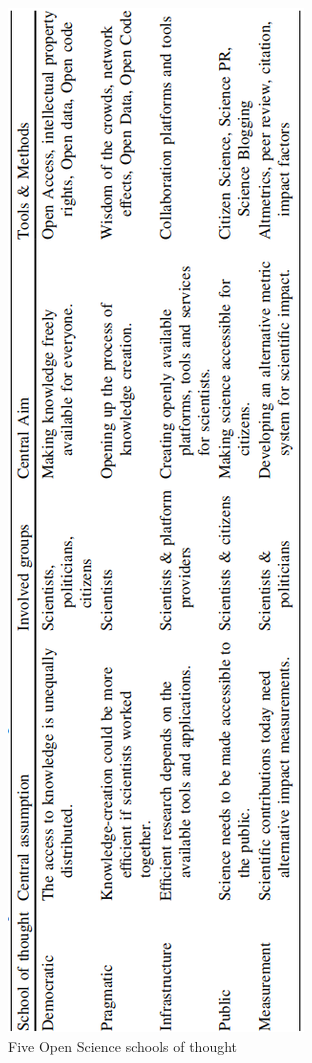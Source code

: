 \begin{figure}[ht]
  \includegraphics[width=\textwidth,height=\textheight,keepaspectratio]{figures/schools.png}%
  \caption{Five Open Science schools of thought}
  \label{tab:method}
  \end{figure} 

